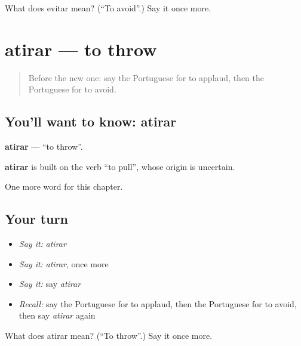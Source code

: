 \begin{tcolorbox}[breakable,colback=teal!4,colframe=teal!35!black,title={Before you move on}]
What does evitar mean? (\textquotedblleft{}To avoid\textquotedblright{}.) Say it once more.
\end{tcolorbox}
\section[atirar]{atirar — to throw}

\label{lesson:PT-C142-atirar}



\begin{quote}
Before the new one: say the Portuguese for to applaud, then the Portuguese for to avoid.
\end{quote}

\subsection*{You'll want to know: atirar}
\textbf{atirar} — \textquotedblleft{}to throw\textquotedblright{}.

\begin{cousinweb}
\textbf{atirar} is built on the verb \textquotedblleft{}to pull\textquotedblright{}, whose origin is uncertain.
\end{cousinweb}

\begin{grammarlens}[title={What you've built}]
One more word for this chapter.
\end{grammarlens}

\subsection*{Your turn}
\begin{itemize}
\raggedright
  \item \emph{Say it:} \emph{atirar}
  \item \emph{Say it:} \emph{atirar}, once more
  \item \emph{Say it:} say \emph{atirar}
  \item \emph{Recall:} say the Portuguese for to applaud, then the Portuguese for to avoid, then say \emph{atirar} again
\end{itemize}

\begin{tcolorbox}[breakable,colback=teal!4,colframe=teal!35!black,title={Before you move on}]
What does atirar mean? (\textquotedblleft{}To throw\textquotedblright{}.) Say it once more.
\end{tcolorbox}
